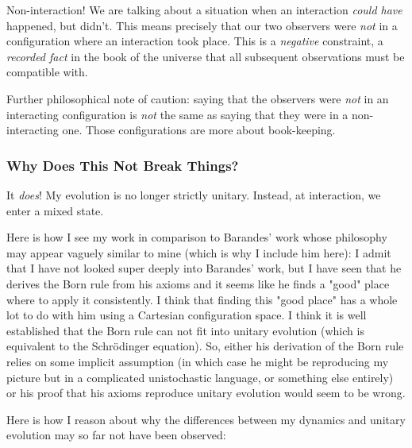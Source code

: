 \documentclass{article}
\begin{document}
Non-interaction! We are talking about a situation when an interaction \textit{could have} happened, but didn't. This means precisely that our two observers were \textit{not} in a configuration where an interaction took place. This is a \textit{negative} constraint, a \textit{recorded fact} in the book of the universe that all subsequent observations must be compatible with.

Further philosophical note of caution: saying that the observers were \textit{not} in an interacting configuration is \textit{not} the same as saying that they were in a non-interacting one. Those configurations are more about book-keeping.

\subsubsection{Why Does This Not Break Things?}

It \textit{does}! My evolution is no longer strictly unitary. Instead, at interaction, we enter a mixed state.

Here is how I see my work in comparison to Barandes' work whose philosophy may appear vaguely similar to mine (which is why I include him here): I admit that I have not looked super deeply into Barandes' work, but I have seen that he derives the Born rule from his axioms and it seems like he finds a "good" place where to apply it consistently. I think that finding this "good place" has a whole lot to do with him using a Cartesian configuration space. I think it is well established that the Born rule can not fit into unitary evolution (which is equivalent to the Schrödinger equation). So, either his derivation of the Born rule relies on some implicit assumption (in which case he might be reproducing my picture but in a complicated unistochastic language, or something else entirely) or his proof that his axioms reproduce unitary evolution would seem to be wrong.

Here is how I reason about why the differences between my dynamics and unitary evolution may so far not have been observed:
\end{document}
